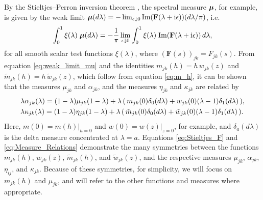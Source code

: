 \documentclass[11pt]{amsart}
\newcommand{\I}{\mathrm{i}}
\newcommand\bmu{\mbox{\boldmath${\mu}$}}
\begin{document}
By the Stieltjes--Perron inversion theorem 
\cite{Henrici:1974:v2,MILTON:2002:TC}, the spectral measure $\bmu$, 
for example, is given by the weak limit 
$\bmu(d\lambda)=-\lim_{\epsilon\downarrow0}\text{Im}(\mathbf{F}(\lambda+\I\epsilon))(d\lambda/\pi)$, i.e.
%
\begin{align}\label{eq:weak_limit_mu}
  \int_0^1\xi(\lambda)\;\bmu(d\lambda)
  =-\frac{1}{\pi}\lim_{\epsilon\downarrow0}
        \int_0^1\xi(\lambda)\;\text{Im}(\mathbf{F}(\lambda+\I\epsilon))\, d\lambda,
\end{align}
%
for all smooth scalar test functions $\xi(\lambda)$, where
$(\mathbf{F}(s))_{jk}=F_{jk}(s)$. From equation
\eqref{eq:weak_limit_mu} and the identities 
$m_{jk}(h)=h\,w_{jk}(z)$ and $\tilde{m}_{jk}(h)=h\,\tilde{w}_{jk}(z)$,
which follow from equation \eqref{eq:m_h}, it can be
shown \cite{Murphy:JMP:063506} that the measures $\mu_{jk}$ and
$\alpha_{jk}$, and the measures $\eta_{jk}$ and $\kappa_{jk}$ are related by  
%
\begin{align}\label{eq:Measure_Relations}
  &\lambda\alpha_{jk}(\lambda)=(1-\lambda)\mu_{jk}(1-\lambda) +
       \lambda\,(\,m_{jk}(0)\delta_0(d\lambda)+w_{jk}(0)(\lambda-1)\delta_1(d\lambda)\,),
  \\
  &\lambda\kappa_{jk}(\lambda)=(1-\lambda)\eta_{jk}(1-\lambda) +
       \lambda\,(\,\tilde{m}_{jk}(0)\delta_0(d\lambda)+\tilde{w}_{jk}(0)(\lambda-1)\delta_1(d\lambda)\,).
  \notag     
\end{align}
%
Here, $m(0)=m(h)|_{h=0}$ and $w(0)=w(z)|_{z=0}$, for example, and
$\delta_a(d\lambda)$ is the delta measure concentrated at $\lambda=a$. Equations 
\eqref{eq:Stieltjes_F} and \eqref{eq:Measure_Relations} demonstrate
the many symmetries between the functions $m_{jk}(h)$, $w_{jk}(z)$,
$\tilde{m}_{jk}(h)$, and $\tilde{w}_{jk}(z)$, and the respective 
measures $\mu_{jk}$, $\alpha_{jk}$, $\eta_{ij}$, and $\kappa_{jk}$. Because of these
symmetries, for simplicity, we will focus on $m_{jk}(h)$ and $\mu_{jk}$,
and will refer to the other functions and measures where
appropriate.  
\end{document}
